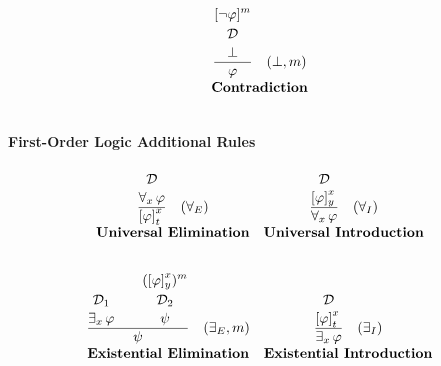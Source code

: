 \[
\begin{array}{c c}
\multicolumn{2}{c}{
\frac{\overset{\displaystyle[\neg\varphi]^m\strut}{\overset{\displaystyle\mathcal{D} \strut} {\displaystyle\bot 
\strut}}}{\displaystyle \varphi\strut} \quad (\bot, m)
} \\[5pt]
\multicolumn{2}{c}{\textbf{Contradiction}} \\[10pt]
\end{array}
\]

\paragraph{First-Order Logic Additional Rules}
\label{sec:fol_rules}

\[
\begin{array}{c c}
\frac{{\overset{\displaystyle\mathcal{D} \strut} {\displaystyle\forall_x \, \varphi 
\strut}}}{\displaystyle\left[ \varphi \right]^x_{\substack{t}}\strut} \quad (\forall_E)
& \frac{{\overset{\displaystyle\mathcal{D} \strut} {\displaystyle\left[ \varphi\right]^x_{\substack{y}} 
\strut}}}{\displaystyle\forall_x \, \varphi\strut} \quad (\forall_I) \\[5pt]
\textbf{Universal Elimination} & \textbf{Universal Introduction}\\[10pt]
\end{array}
\]

\[
\begin{array}{c c}
\frac{\overset{\displaystyle\mathcal{D}_1 \strut} {\displaystyle\exists_x \, \varphi \strut} \quad \quad \overset{\displaystyle(\left[ \varphi \right]^x_{\substack{y}})^m\strut}{\overset{\displaystyle\mathcal{D}_2 \strut} {\displaystyle\psi 
\strut}}}{\displaystyle\psi\strut} \quad (\exists_E, m)
& \frac{{\overset{\displaystyle\mathcal{D} \strut} {\displaystyle\left[ \varphi \right]^x_{\substack{t}} 
\strut}}}{\displaystyle\exists_x \, \varphi\strut} \quad (\exists_I) \\[5pt]
\textbf{Existential Elimination} & \textbf{Existential Introduction}\\[10pt]
\end{array}
\]

